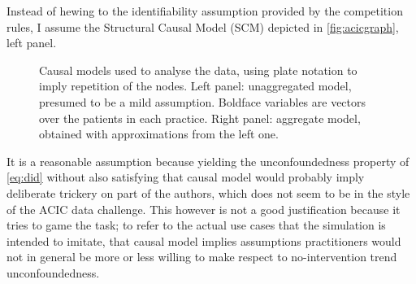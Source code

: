 \documentclass[a4paper]{article}
\theoremstyle{definition}
\let\oldmarginpar\marginpar
\renewcommand{\marginpar}[1]{\oldmarginpar{\sffamily\scriptsize #1}}
\renewcommand{\marginpar}[1]{\relax} %
\begin{document}
    Instead of hewing to the identifiability assumption provided by the competition rules, I assume the Structural Causal Model (SCM) \autocite{pearl2009} depicted in \autoref{fig:acicgraph}, left panel.
    \begin{figure}
        \hfill
        \caption{\label{fig:acicgraph} Causal models used to analyse the data, using plate notation to imply repetition of the nodes. Left panel: unaggregated model, presumed to be a mild assumption. Boldface variables are vectors over the patients in each practice. Right panel: aggregate model, obtained with approximations from the left one.}
    \end{figure}
    It is a reasonable assumption because yielding the unconfoundedness property of \autoref{eq:did} without also satisfying that causal model would probably imply deliberate trickery on part of the authors, which does not seem to be in the style of the ACIC data challenge. This however is not a good justification because it tries to game the task; to refer to the actual use cases that the simulation is intended to imitate, that causal model implies assumptions practitioners\marginpar{Maybe ask Mealli about this.} would not in general be more or less willing to make respect to no-intervention trend unconfoundedness.
\end{document}
